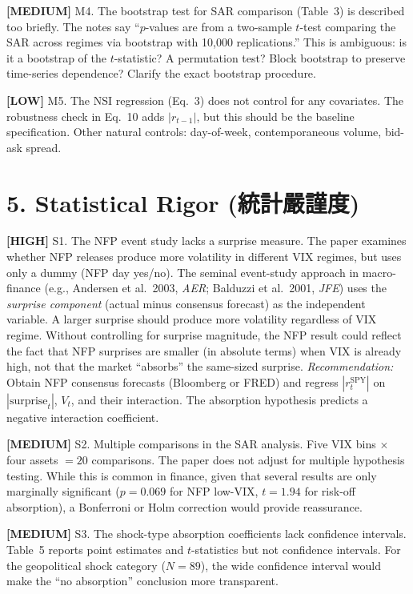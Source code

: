 \documentclass[12pt,a4paper]{article}
\newcommand{\high}[1]{\textcolor{errorred}{\textbf{[HIGH]} #1}}
\newcommand{\med}[1]{\textcolor{warncolor}{\textbf{[MEDIUM]} #1}}
\newcommand{\low}[1]{\textcolor{okgreen}{\textbf{[LOW]} #1}}
\begin{document}
\med{M4. The bootstrap test for SAR comparison (Table~3) is described too briefly.} The notes say ``$p$-values are from a two-sample $t$-test comparing the SAR across regimes via bootstrap with 10,000 replications.'' This is ambiguous: is it a bootstrap of the $t$-statistic? A permutation test? Block bootstrap to preserve time-series dependence? Clarify the exact bootstrap procedure.

\low{M5. The NSI regression (Eq.~3) does not control for any covariates.} The robustness check in Eq.~10 adds $|r_{t-1}|$, but this should be the baseline specification. Other natural controls: day-of-week, contemporaneous volume, bid-ask spread.

\section*{5. Statistical Rigor (統計嚴謹度)}

\high{S1. The NFP event study lacks a surprise measure.} The paper examines whether NFP releases produce more volatility in different VIX regimes, but uses only a dummy (NFP day yes/no). The seminal event-study approach in macro-finance (e.g., Andersen et al.\ 2003, \textit{AER}; Balduzzi et al.\ 2001, \textit{JFE}) uses the \emph{surprise component} (actual minus consensus forecast) as the independent variable. A larger surprise should produce more volatility regardless of VIX regime. Without controlling for surprise magnitude, the NFP result could reflect the fact that NFP surprises are smaller (in absolute terms) when VIX is already high, not that the market ``absorbs'' the same-sized surprise. \emph{Recommendation:} Obtain NFP consensus forecasts (Bloomberg or FRED) and regress $|r_t^{\text{SPY}}|$ on $|\text{surprise}_t|$, $V_t$, and their interaction. The absorption hypothesis predicts a negative interaction coefficient.

\med{S2. Multiple comparisons in the SAR analysis.} Five VIX bins $\times$ four assets $= 20$ comparisons. The paper does not adjust for multiple hypothesis testing. While this is common in finance, given that several results are only marginally significant ($p = 0.069$ for NFP low-VIX, $t = 1.94$ for risk-off absorption), a Bonferroni or Holm correction would provide reassurance.

\med{S3. The shock-type absorption coefficients lack confidence intervals.} Table~5 reports point estimates and $t$-statistics but not confidence intervals. For the geopolitical shock category ($N = 89$), the wide confidence interval would make the ``no absorption'' conclusion more transparent.
\end{document}
